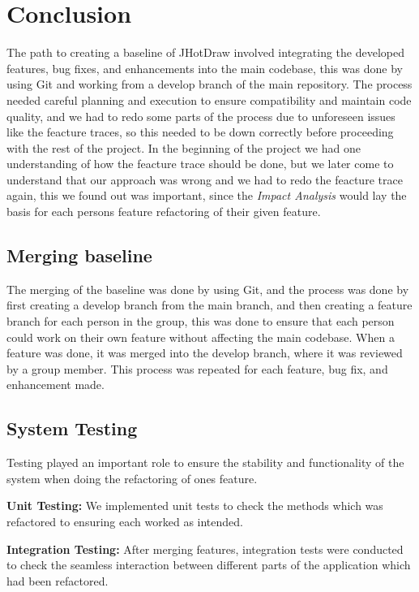 \section{Conclusion}
The path to creating a baseline of JHotDraw involved integrating the developed features, bug fixes, and enhancements into the main codebase, this was done by
using Git and working from a develop branch of the main repository. The process needed careful planning and execution to ensure compatibility and maintain code quality,
and we had to redo some parts of the process due to unforeseen issues like the feacture traces, so this needed to be down correctly before proceeding with the rest of the
project. In the beginning of the project we had one understanding of how the feacture trace should be done, but we later come to understand that our approach was wrong
and we had to redo the feacture trace again, this we found out was important, since the \textit{Impact Analysis} would lay the basis for each persons feature refactoring
of their given feature.

\subsection{Merging baseline}
The merging of the baseline was done by using Git, and the process was done by first creating a develop branch from the main branch, and then creating a feature branch
for each person in the group, this was done to ensure that each person could work on their own feature without affecting the main codebase. When a feature was done, it was
merged into the develop branch, where it was reviewed by a group member. This process was repeated for each feature, bug fix, and enhancement made.

\subsection{System Testing}

Testing played an important role to ensure the stability and functionality of the system when doing the refactoring of ones feature.

\textbf{Unit Testing:} We implemented unit tests to check the methods which was refactored to ensuring each worked as intended.

\textbf{Integration Testing:} After merging features, integration tests were conducted to check the seamless interaction between different parts of the application which had been refactored.

